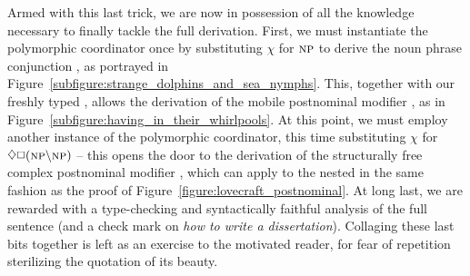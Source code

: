 Armed with this last trick, we are now in possession of all the knowledge necessary to finally tackle the full derivation.
First, we must instantiate the polymorphic coordinator once by substituting $\chi$ for $\np[s]$ to derive the noun phrase conjunction , as portrayed in Figure~\ref{subfigure:strange_dolphins_and_sea_nymphs}.
This, together with our freshly typed , allows the derivation of the mobile postnominal modifier , as in Figure~\ref{subfigure:having_in_their_whirlpools}.
At this point, we must employ another instance of the polymorphic coordinator, this time substituting $\chi$ for $\diamond\Box (\np\divleft\np[s])$ -- this opens the door to the derivation of the structurally free complex postnominal modifier , which can apply to the nested  in the same fashion as the proof of Figure~\ref{figure:lovecraft_postnominal}.
At long last, we are rewarded with a type-checking and syntactically faithful analysis of the full sentence (and a check mark on \textit{how to write a dissertation}).
Collaging these last bits together is left as an exercise to the motivated reader, for fear of repetition sterilizing the quotation of its beauty.

